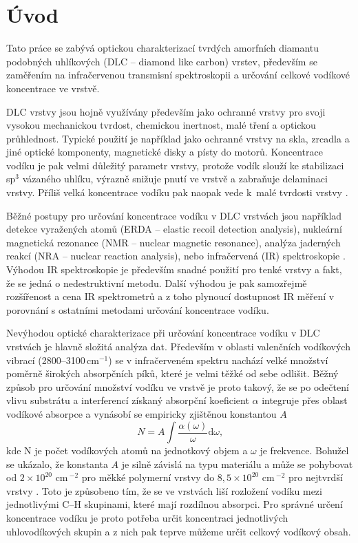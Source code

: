 \chapter*{Úvod}
\setcounter{page}{1}

Tato práce se zabývá optickou charakterizací tvrdých amorfních diamantu podobných uhlíkových (DLC -- diamond like carbon) vrstev, především se zaměřením na infračervenou transmisní spektroskopii a určování celkové vodíkové koncentrace ve vrstvě.

DLC vrstvy jsou hojně využívány především jako ochranné vrstvy pro svoji vysokou mechanickou tvrdost, chemickou inertnost, malé tření a optickou průhlednost. Typické použití je například jako ochranné vrstvy na skla, zrcadla a jiné optické komponenty, magnetické disky a písty do motorů. Koncentrace vodíku je pak velmi důležitý parametr vrstvy, protože vodík slouží ke stabilizaci sp$^3$ vázaného uhlíku, výrazně snižuje pnutí ve vrstvě a zabraňuje delaminaci vrstvy. Příliš velká koncentrace vodíku pak naopak vede k~malé tvrdosti vrstvy \cite{Robertson2002}. 

Běžné postupy pro určování koncentrace vodíku v DLC vrstvách jsou například detekce vyražených atomů (ERDA -- elastic recoil detection analysis), nukleární magnetická rezonance (NMR -- nuclear magnetic resonance), analýza jaderných reakcí (NRA -- nuclear reaction analysis), nebo infračervená (IR) spektroskopie \cite{Robertson2002}. Výhodou IR spektroskopie je především snadné použití pro tenké vrstvy a fakt, že se jedná o nedestruktivní metodu. Další výhodou je pak samozřejmě rozšířenost a cena IR spektrometrů a z toho plynoucí dostupnost IR měření v porovnání s ostatními metodami určování koncentrace vodíku.

Nevýhodou optické charakterizace při určování koncentrace vodíku v DLC vrstvách je hlavně složitá analýza dat. Především v oblasti valenčních vodíkových vibrací (2800--3100\,cm$^{-1}$) se v infračerveném spektru nachází velké množství poměrně širokých absorpčních píků, které je velmi těžké od sebe odlišit. Běžný způsob pro určování množství vodíku ve vrstvě je proto takový, že se po odečtení vlivu substrátu a interferencí získaný absorpční koeficient $\alpha$ integruje přes oblast vodíkové absorpce a vynásobí se empiricky zjištěnou konstantou $A$
\begin{equation}
N = A \int \frac{\alpha(\omega)}{\omega} \mathrm{d}\omega \text{,}
\end{equation}
kde N je počet vodíkových atomů na jednotkový objem a $\omega$ je frekvence. Bohužel se ukázalo, že konstanta $A$ je silně závislá na typu materiálu a může se pohybovat od $2 \times 10^{20}$ cm\,$^{-2}$ pro měkké polymerní vrstvy do $8,5 \times 10^{20}$ cm\,$^{-2}$ pro nejtvrdší vrstvy \cite{jacob1996}. Toto je způsobeno tím, že se ve vrstvách liší rozložení vodíku mezi jednotlivými C--H skupinami, které mají rozdílnou absorpci. Pro správné určení koncentrace vodíku je proto potřeba určit koncentraci jednotlivých uhlovodíkových skupin a z nich pak teprve můžeme určit celkový vodíkový obsah. 

